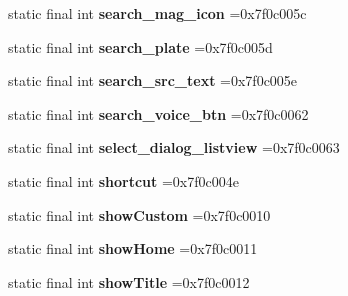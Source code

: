 \begin{DoxyCompactItemize}
\item 
\hypertarget{classcheck_1_1test_1_1_r_1_1id_a56111d9f3bc6ffe56b659968717d7c51}{}static final int {\bfseries search\+\_\+mag\+\_\+icon} =0x7f0c005c\label{classcheck_1_1test_1_1_r_1_1id_a56111d9f3bc6ffe56b659968717d7c51}

\item 
\hypertarget{classcheck_1_1test_1_1_r_1_1id_afbe0678813dad6eea29e5afdddaa81e7}{}static final int {\bfseries search\+\_\+plate} =0x7f0c005d\label{classcheck_1_1test_1_1_r_1_1id_afbe0678813dad6eea29e5afdddaa81e7}

\item 
\hypertarget{classcheck_1_1test_1_1_r_1_1id_a3494f315ed5563a71b53aca71ff55f03}{}static final int {\bfseries search\+\_\+src\+\_\+text} =0x7f0c005e\label{classcheck_1_1test_1_1_r_1_1id_a3494f315ed5563a71b53aca71ff55f03}

\item 
\hypertarget{classcheck_1_1test_1_1_r_1_1id_a07ff2b7bbdc1d835556d534600887751}{}static final int {\bfseries search\+\_\+voice\+\_\+btn} =0x7f0c0062\label{classcheck_1_1test_1_1_r_1_1id_a07ff2b7bbdc1d835556d534600887751}

\item 
\hypertarget{classcheck_1_1test_1_1_r_1_1id_ad85d3d582fac3b51e9d70f5be944d8de}{}static final int {\bfseries select\+\_\+dialog\+\_\+listview} =0x7f0c0063\label{classcheck_1_1test_1_1_r_1_1id_ad85d3d582fac3b51e9d70f5be944d8de}

\item 
\hypertarget{classcheck_1_1test_1_1_r_1_1id_aad0f6a37d175a3aa1b919e668fff34d8}{}static final int {\bfseries shortcut} =0x7f0c004e\label{classcheck_1_1test_1_1_r_1_1id_aad0f6a37d175a3aa1b919e668fff34d8}

\item 
\hypertarget{classcheck_1_1test_1_1_r_1_1id_a2c133929ef60295d5d0633c24d59678a}{}static final int {\bfseries show\+Custom} =0x7f0c0010\label{classcheck_1_1test_1_1_r_1_1id_a2c133929ef60295d5d0633c24d59678a}

\item 
\hypertarget{classcheck_1_1test_1_1_r_1_1id_a6ae31d8708ef22d0ea4e769029a6abe8}{}static final int {\bfseries show\+Home} =0x7f0c0011\label{classcheck_1_1test_1_1_r_1_1id_a6ae31d8708ef22d0ea4e769029a6abe8}

\item 
\hypertarget{classcheck_1_1test_1_1_r_1_1id_a65a54356a295f4aa187dda3abf16b509}{}static final int {\bfseries show\+Title} =0x7f0c0012\label{classcheck_1_1test_1_1_r_1_1id_a65a54356a295f4aa187dda3abf16b509}


\end{DoxyCompactItemize}
